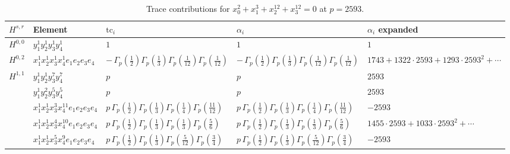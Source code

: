 \documentclass[11pt]{article}
\begin{document}
\begin{table}[ht]
\centering
\caption{Trace contributions for $x_0^{2} + x_1^{3} + x_2^{12} + x_3^{12} = 0$ at $p=2593$.}\label{tab:diagonal-6}
\renewcommand{\arraystretch}{1.1}
{\scriptsize
\begin{tabular}{@{}lllll@{}}
\toprule
$H^{s,r}$ & Element & $\mathrm{tc}_i$ & $\alpha_i$ & $\alpha_i$ expanded \\
\midrule
$H^{0,0}$ & $y_{1}^{1} y_{2}^{1} y_{3}^{1} y_{4}^{1}$ & $1$ & $1$ & $1$ \\
\midrule
$H^{0,2}$ & $x_{1}^{1} x_{2}^{1} x_{3}^{1} x_{4}^{1}  e_{1} e_{2} e_{3} e_{4}$ & $- \, \Gamma_p \left( \frac{1}{2} \right) \Gamma_p \left( \frac{1}{3} \right) \Gamma_p \left( \frac{1}{12} \right) \Gamma_p \left( \frac{1}{12} \right)$ & $- \, \Gamma_p \left( \frac{1}{2} \right) \Gamma_p \left( \frac{1}{3} \right) \Gamma_p \left( \frac{1}{12} \right) \Gamma_p \left( \frac{1}{12} \right)$ & $1743{+}1322{\cdot}2593{+}1293{\cdot}2593^{2}{+}\cdots$ \\
\midrule
$H^{1,1}$ & $y_{1}^{1} y_{2}^{1} y_{3}^{7} y_{4}^{7}$ & $p \,$ & $p \,$ & $2593$ \\
 & $y_{1}^{1} y_{2}^{2} y_{3}^{5} y_{4}^{5}$ & $p \,$ & $p \,$ & $2593$ \\
 & $x_{1}^{1} x_{2}^{1} x_{3}^{3} x_{4}^{11}  e_{1} e_{2} e_{3} e_{4}$ & $p \, \Gamma_p \left( \frac{1}{2} \right) \Gamma_p \left( \frac{1}{3} \right) \Gamma_p \left( \frac{1}{4} \right) \Gamma_p \left( \frac{11}{12} \right)$ & $p \, \Gamma_p \left( \frac{1}{2} \right) \Gamma_p \left( \frac{1}{3} \right) \Gamma_p \left( \frac{1}{4} \right) \Gamma_p \left( \frac{11}{12} \right)$ & $-2593$ \\
 & $x_{1}^{1} x_{2}^{1} x_{3}^{4} x_{4}^{10}  e_{1} e_{2} e_{3} e_{4}$ & $p \, \Gamma_p \left( \frac{1}{2} \right) \Gamma_p \left( \frac{1}{3} \right) \Gamma_p \left( \frac{1}{3} \right) \Gamma_p \left( \frac{5}{6} \right)$ & $p \, \Gamma_p \left( \frac{1}{2} \right) \Gamma_p \left( \frac{1}{3} \right) \Gamma_p \left( \frac{1}{3} \right) \Gamma_p \left( \frac{5}{6} \right)$ & $1455{\cdot}2593{+}1033{\cdot}2593^{2}{+}\cdots$ \\
 & $x_{1}^{1} x_{2}^{1} x_{3}^{5} x_{4}^{9}  e_{1} e_{2} e_{3} e_{4}$ & $p \, \Gamma_p \left( \frac{1}{2} \right) \Gamma_p \left( \frac{1}{3} \right) \Gamma_p \left( \frac{5}{12} \right) \Gamma_p \left( \frac{3}{4} \right)$ & $p \, \Gamma_p \left( \frac{1}{2} \right) \Gamma_p \left( \frac{1}{3} \right) \Gamma_p \left( \frac{5}{12} \right) \Gamma_p \left( \frac{3}{4} \right)$ & $-2593$ \\

\end{tabular}}
\end{table}
\end{document}
